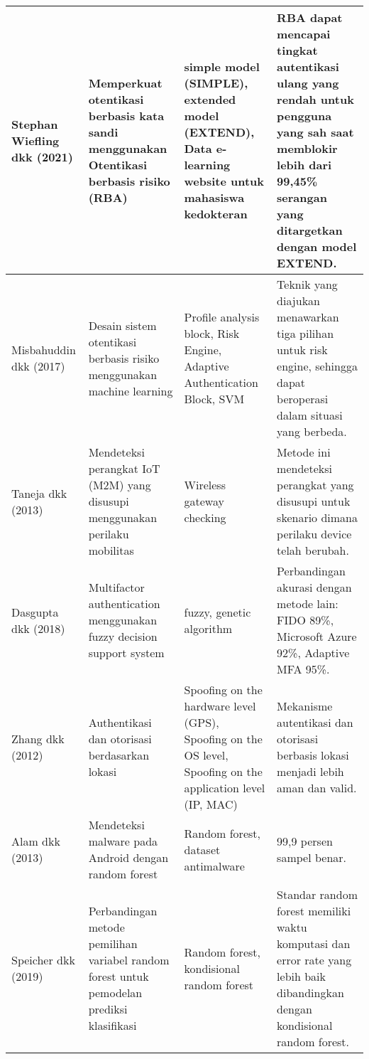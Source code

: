 \begin{longtable}{|p{1.7cm}|p{3.8cm}|p{3.5cm}|p{5cm}|}
    \hline
    Stephan Wiefling dkk (2021) & Memperkuat otentikasi berbasis kata sandi menggunakan Otentikasi berbasis risiko (RBA) & simple model (SIMPLE), extended model (EXTEND), Data e-learning website untuk mahasiswa kedokteran & RBA dapat mencapai tingkat autentikasi ulang yang rendah untuk pengguna yang sah saat memblokir lebih dari 99,45\% serangan yang ditargetkan dengan model EXTEND. \\
    \hline
    Misbahuddin dkk (2017) & Desain sistem otentikasi berbasis risiko menggunakan machine learning & Profile analysis block, Risk Engine, Adaptive Authentication Block, SVM & Teknik yang diajukan menawarkan tiga pilihan untuk risk engine, sehingga dapat beroperasi dalam situasi yang berbeda. \\
    \hline
    Taneja dkk (2013) & Mendeteksi perangkat IoT (M2M) yang disusupi menggunakan perilaku mobilitas & Wireless gateway checking & Metode ini mendeteksi perangkat yang disusupi untuk skenario dimana perilaku device telah berubah. \\
    \hline
    Dasgupta dkk (2018) & Multifactor authentication menggunakan fuzzy decision support system & fuzzy, genetic algorithm & Perbandingan akurasi dengan metode lain: FIDO 89\%, Microsoft Azure 92\%, Adaptive MFA 95\%. \\
    \hline
    Zhang dkk (2012) & Authentikasi dan otorisasi berdasarkan lokasi & Spoofing on the hardware level (GPS), Spoofing on the OS level, Spoofing on the application level (IP, MAC) & Mekanisme autentikasi dan otorisasi berbasis lokasi menjadi lebih aman dan valid. \\
    \hline
    Alam dkk (2013) & Mendeteksi malware pada Android dengan random forest & Random forest, dataset antimalware & 99,9 persen sampel benar. \\
    \hline
    Speicher dkk (2019) & Perbandingan metode pemilihan variabel random forest untuk pemodelan prediksi klasifikasi & Random forest, kondisional random forest & Standar random forest memiliki waktu komputasi dan error rate yang lebih baik dibandingkan dengan kondisional random forest. \\
    \hline
\end{longtable}

